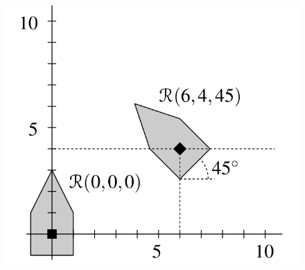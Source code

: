 \documentclass[a4paper,12pt]{report}
\begin{document}
\begin{figure}[H]
\centering
\includegraphics[scale=0.25]{work_space_with_rotate.png}
\end{figure}
\end{document}
